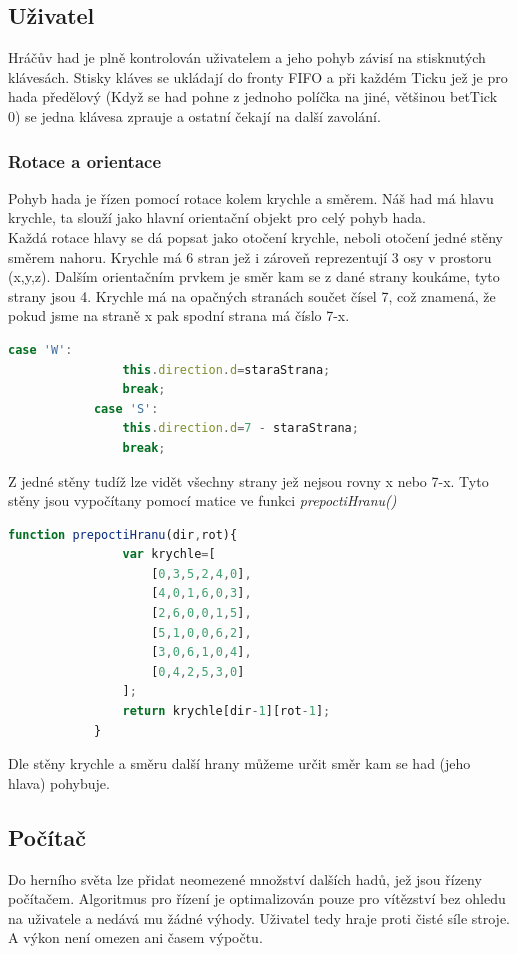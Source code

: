 \documentclass[a4paper,titlepage]{article}
\begin{document}
	\subsection{Uživatel}
		Hráčův had je plně kontrolován uživatelem a jeho pohyb závisí na stisknutých klávesách.
		Stisky kláves se ukládají do fronty FIFO a při každém Ticku jež je pro hada předělový
		(Když se had pohne z jednoho políčka na jiné, většinou betTick 0)
		se jedna klávesa zprauje a ostatní čekají na další zavolání.
	\subsubsection{Rotace a orientace}
		Pohyb hada je řízen pomocí rotace kolem krychle a směrem.
		Náš had má hlavu krychle, ta slouží jako hlavní orientační objekt pro celý pohyb hada.\\
		Každá rotace hlavy se dá popsat jako otočení krychle, neboli otočení jedné stěny směrem nahoru.
		Krychle má 6 stran jež i zároveň reprezentují 3 osy v prostoru (x,y,z).
		Dalším orientačním prvkem je směr kam se z dané strany koukáme, tyto strany jsou 4.
		Krychle má na opačných stranách součet čísel 7, což znamená, že pokud jsme na straně x pak
		spodní strana má číslo 7-x.
		\begin{lstlisting}[language=javascript]
			case 'W': 
				this.direction.d=staraStrana;
				break;
			case 'S': 
				this.direction.d=7 - staraStrana;
				break;
		\end{lstlisting}		
		Z jedné stěny tudíž lze vidět všechny strany jež nejsou rovny x nebo 7-x.
		Tyto stěny jsou vypočítany pomocí matice ve funkci \textit{prepoctiHranu()}
		\begin{lstlisting}[language=javascript]
			function prepoctiHranu(dir,rot){
				var krychle=[
					[0,3,5,2,4,0],
					[4,0,1,6,0,3],
					[2,6,0,0,1,5],
					[5,1,0,0,6,2],
					[3,0,6,1,0,4],
					[0,4,2,5,3,0]
				];
				return krychle[dir-1][rot-1];
			}
		\end{lstlisting}
		Dle stěny krychle a směru další hrany můžeme určit směr kam se had (jeho hlava) pohybuje.\\
		 
	\subsection{Počítač}
		Do herního světa lze přidat neomezené množství dalších hadů, jež jsou řízeny počítačem.
		Algoritmus pro řízení je optimalizován pouze pro vítězství bez ohledu na uživatele a 
		nedává mu žádné výhody. Uživatel tedy hraje proti čisté síle stroje. A výkon není omezen ani časem výpočtu.
\end{document}
